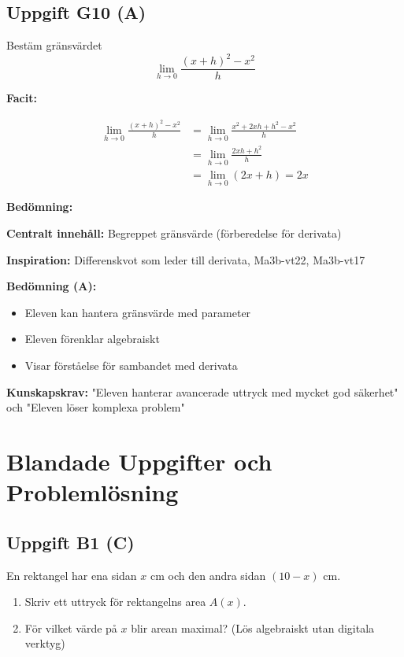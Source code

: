 \documentclass[12pt]{article}
\begin{document}
\subsection*{Uppgift G10 (A)}
Bestäm gränsvärdet
\[
\lim_{h \to 0} \frac{(x + h)^2 - x^2}{h}
\]

\begin{facitbox}
\textbf{Facit:}

\begin{align*}
\lim_{h \to 0} \frac{(x + h)^2 - x^2}{h} &= \lim_{h \to 0} \frac{x^2 + 2xh + h^2 - x^2}{h} \\
&= \lim_{h \to 0} \frac{2xh + h^2}{h} \\
&= \lim_{h \to 0} (2x + h) = 2x
\end{align*}
\end{facitbox}

\begin{refbox}
\textbf{Bedömning:}

\textbf{Centralt innehåll:} Begreppet gränsvärde (förberedelse för derivata)

\textbf{Inspiration:} Differenskvot som leder till derivata, Ma3b-vt22, Ma3b-vt17

\textbf{Bedömning (A):}
\begin{itemize}
    \item Eleven kan hantera gränsvärde med parameter
    \item Eleven förenklar algebraiskt
    \item Visar förståelse för sambandet med derivata
\end{itemize}

\textbf{Kunskapskrav:} "Eleven hanterar avancerade uttryck med mycket god säkerhet" och "Eleven löser komplexa problem"
\end{refbox}

\newpage

\section{Blandade Uppgifter och Problemlösning}

\subsection*{Uppgift B1 (C)}
En rektangel har ena sidan $x$ cm och den andra sidan $(10 - x)$ cm.
\begin{enumerate}[label=\alph*)]
    \item Skriv ett uttryck för rektangelns area $A(x)$.
    \item För vilket värde på $x$ blir arean maximal? (Lös algebraiskt utan digitala verktyg)
\end{enumerate}
\end{document}
